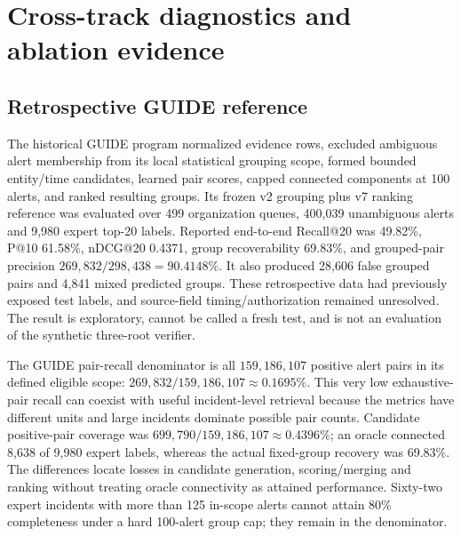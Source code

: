 \section{Cross-track diagnostics and ablation evidence}\label{sec:extended}
\subsection{Retrospective GUIDE reference}
The historical GUIDE program normalized evidence rows, excluded ambiguous alert membership from its local statistical grouping scope, formed bounded entity/time candidates, learned pair scores, capped connected components at 100 alerts, and ranked resulting groups. Its frozen v2 grouping plus v7 ranking reference was evaluated over 499 organization queues, 400,039 unambiguous alerts and 9,980 expert top-20 labels. Reported end-to-end Recall@20 was 49.82\%, P@10 61.58\%, nDCG@20 0.4371, group recoverability 69.83\%, and grouped-pair precision $269{,}832/298{,}438=90.4148\%$. It also produced 28,606 false grouped pairs and 4,841 mixed predicted groups. These retrospective data had previously exposed test labels, and source-field timing/authorization remained unresolved. The result is exploratory, cannot be called a fresh test, and is not an evaluation of the synthetic three-root verifier.

The GUIDE pair-recall denominator is all $159{,}186{,}107$ positive alert pairs in its defined eligible scope: $269{,}832/159{,}186{,}107\approx0.1695\%$. This very low exhaustive-pair recall can coexist with useful incident-level retrieval because the metrics have different units and large incidents dominate possible pair counts. Candidate positive-pair coverage was $699{,}790/159{,}186{,}107\approx0.4396\%$; an oracle connected 8,638 of 9,980 expert labels, whereas the actual fixed-group recovery was 69.83\%. The differences locate losses in candidate generation, scoring/merging and ranking without treating oracle connectivity as attained performance. Sixty-two expert incidents with more than 125 in-scope alerts cannot attain 80\% completeness under a hard 100-alert group cap; they remain in the denominator.

